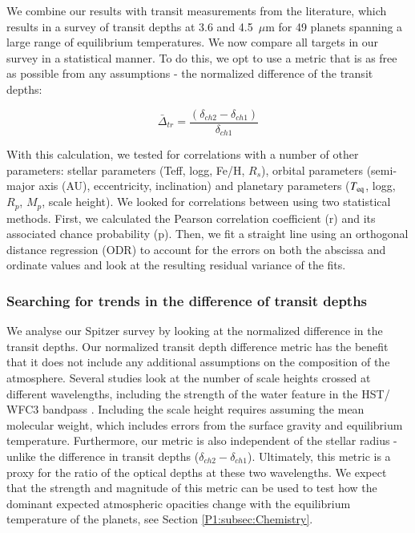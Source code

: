 We combine our results with transit measurements from the literature, which results in a survey of transit depths at 3.6 and 4.5~$\mu$m for 49 planets spanning a large range of equilibrium temperatures. We now compare all targets in our survey in a statistical manner. To do this, we opt to use a metric that is as free as possible from any assumptions - the normalized difference of the transit depths:

\begin{equation}
     \bar{\Delta}_{tr} = \frac{(\delta_{ch2} - \delta_{ch1})}{\delta_{ch1}}
\end{equation}

With this calculation, we tested for correlations with a number of other parameters:  stellar parameters (Teff, logg, Fe/H, $R_s$), orbital parameters (semi-major axis (AU), eccentricity, inclination) and planetary parameters ($T_{\rm eq}$, logg, $R_p$, $M_p$, scale height). We looked for correlations between using two statistical methods. First, we calculated the Pearson correlation coefficient (r) and its associated chance probability (p). Then, we fit a straight line using an orthogonal distance regression (ODR) to account for the errors on both the abscissa and ordinate values \citet{Boggs1989} and look at the resulting residual variance of the fits.

\subsubsection{Searching for trends in the difference of transit depths}

We analyse our Spitzer survey by looking at the normalized difference in the transit depths. Our normalized transit depth difference metric has the benefit that it does not include any additional assumptions on the composition of the atmosphere.  Several studies look at the number of scale heights crossed at different wavelengths, including the strength of the water feature in the HST/ WFC3 bandpass \citep[e.g.,][]{Sing2016}. Including the scale height requires assuming the mean molecular weight, which includes errors from the surface gravity and equilibrium temperature. Furthermore, our metric is also independent of the stellar radius - unlike the difference in transit depths ($\delta_{ch2} - \delta_{ch1}$). Ultimately, this metric is a proxy for the ratio of the optical depths at these two wavelengths. We expect that the strength and magnitude of this metric can be used to test how the dominant expected atmospheric opacities change with the equilibrium temperature of the planets, see Section \ref{P1:subsec:Chemistry}.

